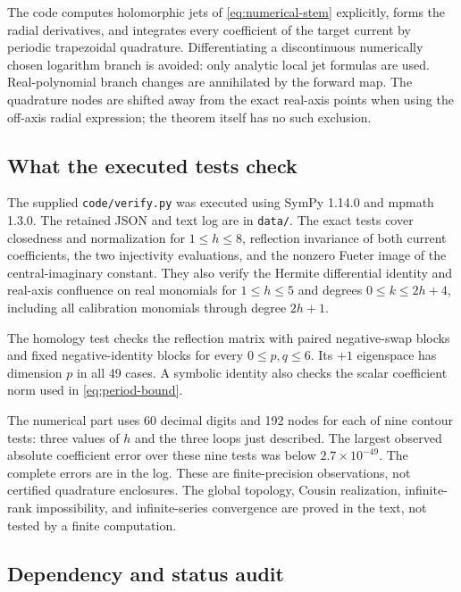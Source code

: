 \documentclass[11pt,a4paper]{article}
\numberwithin{equation}{section}
\theoremstyle{definition}
\theoremstyle{remark}
\begin{document}
The code computes holomorphic jets of \eqref{eq:numerical-stem} explicitly,
forms the radial derivatives, and integrates every coefficient of the target
current by periodic trapezoidal quadrature. Differentiating a discontinuous
numerically chosen logarithm branch is avoided: only analytic local jet
formulas are used. Real-polynomial branch changes are annihilated by the
forward map. The quadrature nodes are shifted away from the exact real-axis
points when using the off-axis radial expression; the theorem itself has no
such exclusion.

\subsection{What the executed tests check}

The supplied \texttt{code/verify.py} was executed using SymPy 1.14.0 and
mpmath 1.3.0. The retained JSON and text log are in \texttt{data/}.
The exact tests cover closedness and normalization for $1\le h\le8$,
reflection invariance of both current coefficients, the two injectivity
evaluations, and the nonzero Fueter image of the central-imaginary constant.
They also verify the Hermite differential identity and real-axis confluence
on real monomials for $1\le h\le5$ and degrees $0\le k\le2h+4$, including
all calibration monomials through degree $2h+1$.

The homology test checks the reflection matrix with paired negative-swap
blocks and fixed negative-identity blocks for every $0\le p,q\le6$. Its
$+1$ eigenspace has dimension $p$ in all 49 cases. A symbolic identity also
checks the scalar coefficient norm used in \eqref{eq:period-bound}.

The numerical part uses 60 decimal digits and 192 nodes for each of nine
contour tests: three values of $h$ and the three loops just described.
The largest observed absolute coefficient error over these nine tests was
below $2.7\times10^{-49}$. The complete errors are in the log. These are
finite-precision observations, not certified quadrature enclosures. The global topology,
Cousin realization, infinite-rank impossibility, and infinite-series convergence
are proved in the text, not tested by a finite computation.

\subsection{Dependency and status audit}
\end{document}
